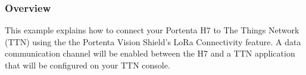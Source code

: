 \begin{itemize}
\subsubsection{Overview}
This example explains how to connect your Portenta H7 to The Things Network (TTN) using the the Portenta Vision Shield's LoRa Connectivity feature. A data communication channel will be enabled between the H7 and a TTN application that will be configured on your TTN console. \cite{ArduinoTTN:2024}
%	
%	
%	

\end{itemize}
